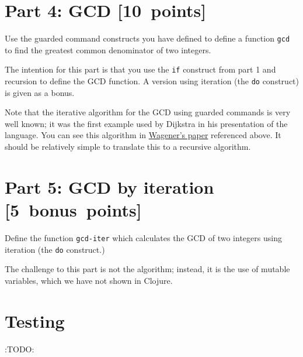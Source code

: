 \documentclass[11pt]{article}
\begin{document}
\section*{Part 4: GCD                                                   [10 points]}
\label{sec:org1ffb7e2}
Use the guarded command constructs you have defined
to define a function \texttt{gcd} to find the greatest common denominator
of two integers.

The intention for this part is that you use the \texttt{if} construct
from part 1 and recursion to define the GCD function.
A version using iteration (the \texttt{do} construct) is given as a bonus.

Note that the iterative algorithm for the GCD using guarded commands is
very well known; it was the first example used by Dijkstra
in his presentation of the language.
You can see this algorithm in
\href{https://dl.acm.org/doi/10.5555/1074100.1074433}{Wagener's paper} referenced above.
It should be relatively simple to translate this to a recursive algorithm.

\section*{Part 5: GCD by iteration [5 bonus points]}
\label{sec:orgf28364d}
Define the function \texttt{gcd-iter} which calculates the GCD of two integers
using iteration (the \texttt{do} construct.)

The challenge to this part is not the algorithm;
instead, it is the use of mutable variables,
which we have not shown in Clojure.

\section*{Testing}
\label{sec:org1ea9e24}
:TODO:
\end{document}
